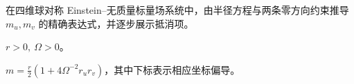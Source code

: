 


在四维球对称 Einstein–无质量标量场系统中，由半径方程与两条零方向约束推导 \(m_u,m_v\) 的精确表达式，并逐步展示抵消项。



\(r>0,\ \Omega>0\)。



\(m=\frac r2(1+4\Omega^{-2}r_u r_v)\)，其中下标表示相应坐标偏导。
